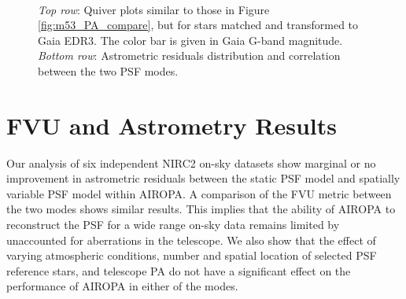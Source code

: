 \documentclass[]{spie}  %
\begin{document}
\begin{figure}
  \centering
  \\
  \hspace{-1cm}
  \caption{\textit{Top row}: Quiver plots similar to those in Figure \ref{fig:m53_PA_compare}, but for stars matched and transformed to Gaia EDR3. The color bar is given in Gaia G-band magnitude. \textit{Bottom row}: Astrometric residuals distribution and correlation between the two PSF modes.} \label{fig:m53_PA_compare_gaia}
\end{figure}


\section{FVU and Astrometry Results} \label{sec:fvu-astrom-results}
Our analysis of six independent NIRC2 on-sky datasets show marginal or no improvement in astrometric residuals between the static PSF model and spatially variable PSF model within AIROPA. A comparison of the FVU metric between the two modes shows similar results. This implies that the ability of AIROPA to reconstruct the PSF for a wide range on-sky data remains limited by unaccounted for aberrations in the telescope. We also show that the effect of varying atmospheric conditions, number and spatial location of selected PSF reference stars, and telescope PA do not have a significant effect on the performance of AIROPA in either of the modes.
\end{document}
